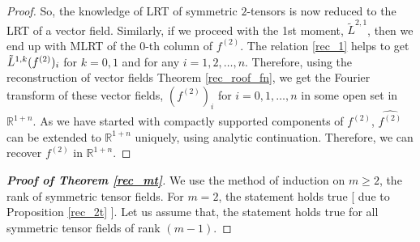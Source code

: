\documentclass[11pt,a4paper,reqno]{amsart}
\newcommand{\R}{\mathbb{R}}
\begin{document}
\begin{proof}
		
		So, the knowledge of LRT of symmetric $2$-tensors is now reduced to the LRT of a vector field. 
		Similarly, if we proceed with the 1st moment, $\tilde{L}^{2,1}$, then we end up with MLRT of the $0$-th column of $f^{(2)}$.
		The relation \eqref{rec_1} helps to get $\Tilde{L}^{1,k}(f^{(2)})_{i}$ for $k=0,1$ and for any $i=1,2,\dots,n$.
		Therefore, using the reconstruction of vector fields Theorem \ref{rec_roof_fn}, we get the Fourier transform of these vector fields, $(f^{(2)})_i$ for $i=0,1,\dots,n$ in some open set in $\mathbb{R}^{1+n}$.
		As we have started with compactly supported components of $f^{(2)}$, $\widehat{f^{(2)}}$ can be extended to $\R^{1+n}$ uniquely, using analytic continuation. 
		Therefore, we can recover $f^{(2)}$ in $\mathbb{R}^{1+n}$.
	\end{proof}
	\begin{proof}[\textbf{Proof of Theorem \ref{rec_mt}}]
		We use the method of induction on $m\geq 2$, the rank of symmetric tensor fields. For $m=2$, the statement holds true [ due to Proposition \ref{rec_2t} ]. Let us assume that, the statement holds true for all symmetric tensor fields of rank $(m-1).$ 
		

\end{proof}
\end{document}
